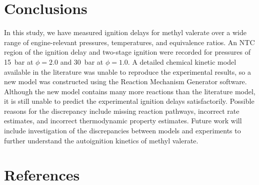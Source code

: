 \documentclass[letterpaper, review]{elsarticle}
\begin{document}
\section{Conclusions}\label{sec:conclusions}

In this study, we have measured ignition delays for methyl valerate over a wide
range of engine-relevant pressures, temperatures, and equivalence ratios. An NTC
region of the ignition delay and two-stage ignition were recorded for pressures
of \SI{15}{\bar} at \(\phi=2.0\) and \SI{30}{\bar} at \(\phi=1.0\). A detailed
chemical kinetic model available in the literature was unable to reproduce the
experimental results, so a new model was constructed using the Reaction
Mechanism Generator software. Although the new model contains many more
reactions than the literature model, it is still unable to predict the
experimental ignition delays satisfactorily. Possible reasons for the
discrepancy include missing reaction pathways, incorrect rate estimates, and
incorrect thermodynamic property estimates. Future work will include
investigation of the discrepancies between models and experiments to further
understand the autoignition kinetics of methyl valerate.

\section*{References}

\end{document}
